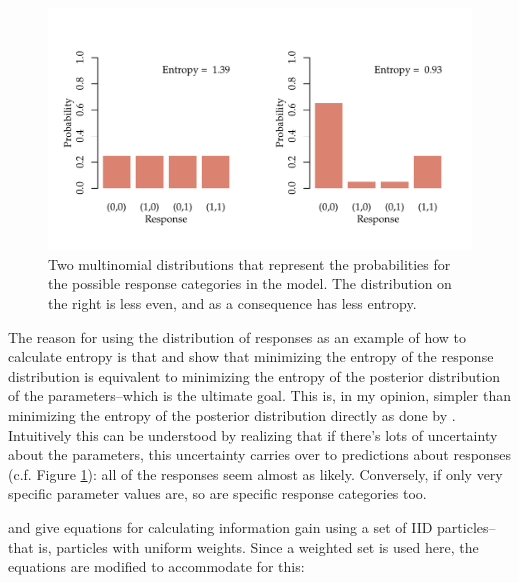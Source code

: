 \documentclass{article}\usepackage{knitr}
\begin{document}
\begin{figure}
\begin{center}
\begin{knitrout}
\color{fgcolor}
\includegraphics[width=\maxwidth]{figure/unnamed-chunk-14-1} 

\end{knitrout}
\end{center}
\caption{Two multinomial distributions that represent the probabilities for the possible response categories in the model. The distribution on the right is less even, and as a consequence has less entropy.}
\label{fig:entropy}
\end{figure}

The reason for using the distribution of responses as an example of how to calculate entropy is that \citet{kujalalukka2006} and \citet{kujala2011} show that minimizing the entropy of the response distribution is equivalent to minimizing the entropy of the posterior distribution of the parameters--which is the ultimate goal. This is, in my opinion, simpler than minimizing the entropy of the posterior distribution directly as done by \citet{kontsevichtyler1999}. Intuitively this can be understood by realizing that if there's lots of uncertainty about the parameters, this uncertainty carries over to predictions about responses (c.f. Figure \ref{fig:entropy}): all of the responses seem almost as likely. Conversely, if only very specific parameter values are, so are specific response categories too. 

\citet{kujalalukka2006} and \citet{kujala2011} give equations for calculating information gain using a set of IID particles--that is, particles with uniform weights. Since a weighted set is used here, the equations are modified to accommodate for this:
\end{document}
